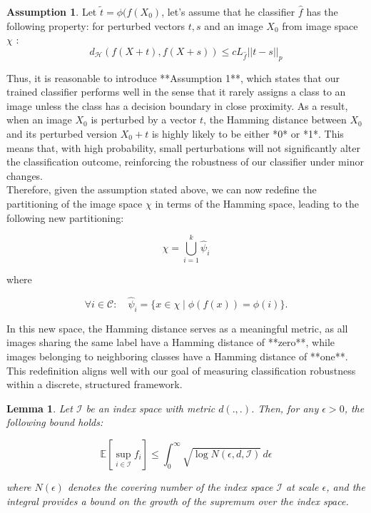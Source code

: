 \documentclass{article}
\theoremstyle{plain}
\newtheorem{lemma}[theorem]{Lemma}
\theoremstyle{definition}
\newtheorem{assumption}[theorem]{Assumption}
\theoremstyle{remark}
\begin{document}
\begin{assumption}
Let $\tilde{t} = \phi(f(X_0)$, let's assume that he classifier $\hat{f}$ has the following property: for perturbed vectors $t,s$ and an image $X_0$ from image space $\chi$ :
\begin{equation*}
    d_\mathcal{H}( f(X+t), f(X+s) ) \leq c L_{\hat{f}} ||t-s||_p
\end{equation*}
\end{assumption}

Thus, it is reasonable to introduce **Assumption 1**, which states that our trained classifier performs well in the sense that it rarely assigns a class to an image unless the class has a decision boundary in close proximity. As a result, when an image \( X_0 \) is perturbed by a vector \( t \), the Hamming distance between \( X_0 \) and its perturbed version \( X_0 + t \) is highly likely to be either *0* or *1*. This means that, with high probability, small perturbations will not significantly alter the classification outcome, reinforcing the robustness of our classifier under minor changes.
\\
Therefore, given the assumption stated above, we can now redefine the partitioning of the image space \( \chi \) in terms of the Hamming space, leading to the following new partitioning:  

\[
\chi = \bigcup_{i=1}^{k} \hat{\psi}_i
\]

where  

\[
\forall i \in \mathcal{C}:  
\quad \hat{\psi}_i = \{ x \in \chi \mid \phi(f(x)) = \phi(i) \}.
\]

In this new space, the Hamming distance serves as a meaningful metric, as all images sharing the same label have a Hamming distance of **zero**, while images belonging to neighboring classes have a Hamming distance of **one**. This redefinition aligns well with our goal of measuring classification robustness within a discrete, structured framework.

\begin{lemma}
Let \( \mathcal{I} \) be an index space with metric $d(.,.)$. Then, for any \( \epsilon > 0 \), the following bound holds:

\[
\mathbb{E} \left[ \sup_{i \in \mathcal{I}} f_i \right] \leq \int_0^\infty \sqrt{\log N(\epsilon, d, \mathcal{I})} \, d\epsilon
\]

where \( N(\epsilon) \) denotes the covering number of the index space \( \mathcal{I} \) at scale \( \epsilon \), and the integral provides a bound on the growth of the supremum over the index space.
\end{lemma}
\end{document}
